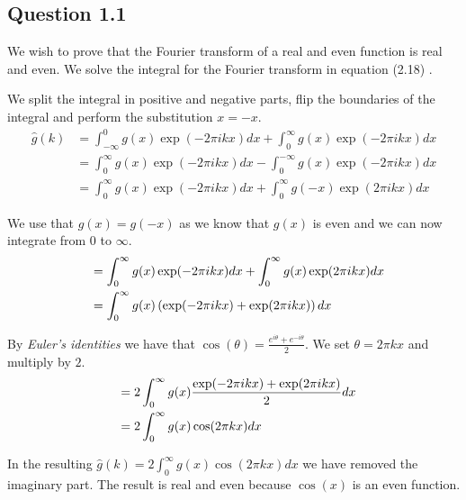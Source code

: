 \documentclass[a4paper, 10pt, final]{article}
\title{\mytitle}
\subtitle{\mysubtitle}
\author{\myauthor{} - \mymail}
\date{\mydate}
\begin{document}
\maketitle

\subsection*{Question 1.1}
We wish to prove that the Fourier transform of a real and even function
is real and even. We solve the integral for the Fourier transform in
equation (2.18) \citet[p. 44]{jahne-digital}.

We split the integral in positive and negative parts, flip the
boundaries of the integral and perform the substitution $x = -x$.
\begin{align*}
    \hat{g}(k) & = \int_{-\infty}^{0}{g(x)\exp(-2\pi ikx)dx} + \int_{0}^{\infty}{g(x)\exp(-2\pi ikx)dx}\\
               & = \int_{0}^{\infty}{g(x)\exp(-2\pi ikx)dx} - \int_{0}^{-\infty}{g(x)\exp(-2\pi ikx)dx}\\
               & = \int_{0}^{\infty}{g(x)\exp(-2\pi ikx)dx} + \int_{0}^{\infty}{g(-x)\exp(2\pi ikx)dx}
\end{align*}

We use that $g(x) = g(-x)$ as we know that $g(x)$ is even and we can now
integrate from $0$ to $\infty$.
\begin{align*}
    \hspace{0.5em} &= \int_{0}^{\infty}{g(x)\exp(-2\pi ikx)dx} + \int_{0}^{\infty}{g(x)\exp(2\pi ikx)dx}\\
               & = \int_{0}^{\infty}{g(x)\left(\exp(-2\pi ikx) + \exp(2\pi ikx)\right)dx}
\end{align*}

By \emph{Euler's identities} we have that $\cos(\theta) =
\frac{e^{i\theta} + e^{-i\theta}}{2}$. We set $\theta = 2\pi kx$ and
multiply by $2$.
\begin{align*}
    \hspace{0.5em} & = 2 \int_{0}^{\infty}{g(x)\frac{\exp(-2\pi ikx) + \exp(2\pi ikx)}{2}dx}\\
               & = 2 \int_{0}^{\infty}{g(x)\cos(2\pi kx)dx}
\end{align*}

In the resulting $\hat{g}(k) = 2 \int_{0}^{\infty}{g(x)\cos(2\pi kx)dx}$
we have removed the imaginary part. The result is real and even because
$\cos(x)$ is an even function.
\end{document}

